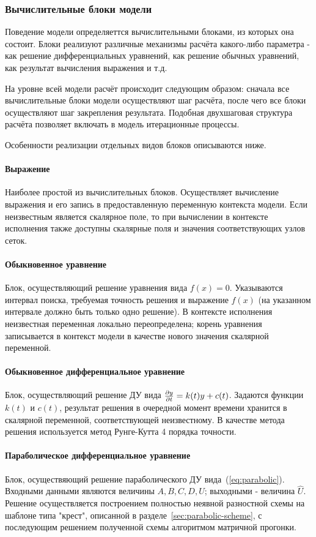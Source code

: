 \subsubsection{Вычислительные блоки модели}
Поведение модели определяеттся вычислительными блоками, из которых она состоит. 
Блоки реализуют различные механизмы расчёта какого-либо параметра - как решение 
дифференциальных уравнений, как решение обычных уравнений, как результат 
вычисления выражения и т.д.

На уровне всей модели расчёт происходит следующим образом: сначала все 
вычислительные блоки модели осуществляют шаг расчёта, после чего все блоки 
осуществляют шаг закрепления результата. Подобная двухшаговая структура расчёта 
позволяет включать в модель итерационные процессы.

Особенности реализации отдельных видов блоков описываются ниже.

\paragraph{Выражение}
Наиболее простой из вычислительных блоков. Осуществляет вычисление выражения и 
его запись в предоставленную переменную контекста модели. Если неизвестным 
является скалярное поле, то при вычислении в контексте исполнения также 
доступны скалярные поля и значения соответствующих узлов сеток.

\paragraph{Обыкновенное уравнение}
Блок, осуществляющий решение уравнения вида $f(x) = 0$. Указываются интервал 
поиска, требуемая точность решения и выражение $f(x)$ (на указанном интервале 
должно быть только одно решение). В контексте исполнения неизвестная переменная 
локально переопределена; корень уравнения записывается в контекст модели в 
качестве нового значения скалярной переменной.

\paragraph{Обыкновенное дифференциальное уравнение}
Блок, осуществляющий решение ДУ вида $\frac{\partial y}{\partial t} = k(t)y + c(t)$. 
Задаются функции $k(t)$ и $c(t)$, результат решения в очередной момент времени 
хранится в скалярной переменной, соответствующей неизвестному. В качестве 
метода решения используется метод Рунге-Кутта 4 порядка точности.

\paragraph{Параболическое дифференциальное уравнение}
Блок, осуществяющий решение параболического ДУ вида~(\ref{eq:parabolic}). 
Входными данными являются величины $A,B,C,D,U$; выходными - величина $\hat{U}$. 
Решение осуществляется построением полностью неявной разностной схемы на 
шаблоне типа "крест", описанной в разделе~\ref{sec:parabolic-scheme}, с 
последующим решением полученной схемы алгоритмом матричной прогонки.

